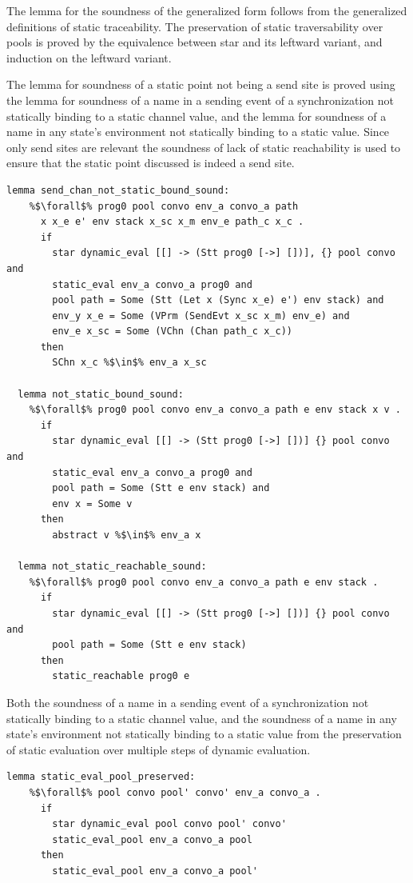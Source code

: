\documentclass{article}
\begin{document}
The lemma for the soundness of the generalized form follows from the generalized definitions
of static traceability. The preservation of static traversability over pools is proved by the
equivalence between star and its leftward variant, and induction on the leftward variant.

The lemma for soundness of a static point not being a send site is proved using the lemma for
soundness of a name in a sending event of a synchronization not statically binding to a static
channel value, and the lemma for soundness of a name in any state's environment
not statically binding to a static value.  Since only send sites are relevant
the soundness of lack of static reachability is
used to ensure that the static point discussed is indeed a send site. 

\begin{lstlisting}[language=logic, escapechar=\%]
  lemma send_chan_not_static_bound_sound:
    %$\forall$% prog0 pool convo env_a convo_a path
      x x_e e' env stack x_sc x_m env_e path_c x_c .
      if
        star dynamic_eval [[] -> (Stt prog0 [->] [])], {} pool convo and
        static_eval env_a convo_a prog0 and
        pool path = Some (Stt (Let x (Sync x_e) e') env stack) and
        env_y x_e = Some (VPrm (SendEvt x_sc x_m) env_e) and
        env_e x_sc = Some (VChn (Chan path_c x_c))
      then
        SChn x_c %$\in$% env_a x_sc

  lemma not_static_bound_sound:
    %$\forall$% prog0 pool convo env_a convo_a path e env stack x v .
      if
        star dynamic_eval [[] -> (Stt prog0 [->] [])] {} pool convo and
        static_eval env_a convo_a prog0 and 
        pool path = Some (Stt e env stack) and 
        env x = Some v
      then
        abstract v %$\in$% env_a x

  lemma not_static_reachable_sound:
    %$\forall$% prog0 pool convo env_a convo_a path e env stack .
      if
        star dynamic_eval [[] -> (Stt prog0 [->] [])] {} pool convo and
        pool path = Some (Stt e env stack)
      then
        static_reachable prog0 e
\end{lstlisting}

Both the soundness of a name in a sending event of a synchronization not statically binding
to a static
channel value, and the soundness of a name in any state's environment not statically binding
to a static value from the preservation of static evaluation over multiple steps of dynamic
evaluation.

\begin{lstlisting}[language=logic, escapechar=\%]
  lemma static_eval_pool_preserved:
    %$\forall$% pool convo pool' convo' env_a convo_a .
      if
        star dynamic_eval pool convo pool' convo' 
        static_eval_pool env_a convo_a pool
      then
        static_eval_pool env_a convo_a pool'
\end{lstlisting}
\end{document}

